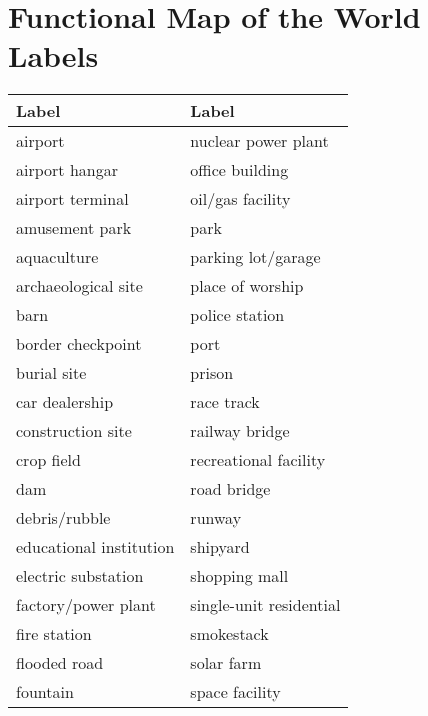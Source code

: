 \documentclass[../thesis.tex]{subfiles}
\begin{document}
    \chapter{Functional Map of the World Labels}
    \label{fmow_labels}
    
    \begin{table}[h]
    	\centering
    	\begin{tabular}{@{}ll@{}}
    		\toprule
    		Label                         & Label                    \\ \midrule
    		airport                       & nuclear power plant      \\
    		airport hangar                & office building          \\
    		airport terminal              & oil/gas facility         \\
    		amusement park                & park                     \\
    		aquaculture                   & parking lot/garage       \\
    		archaeological site           & place of worship         \\
    		barn                          & police station           \\
    		border checkpoint             & port                     \\
    		burial site                   & prison                   \\
    		car dealership                & race track               \\
    		construction site             & railway bridge           \\
    		crop field                    & recreational facility    \\
    		dam                           & road bridge              \\
    		debris/rubble                 & runway                   \\
    		educational institution       & shipyard                 \\
    		electric substation           & shopping mall            \\
    		factory/power plant           & single-unit residential  \\
    		fire station                  & smokestack               \\
    		flooded road                  & solar farm               \\  
    		fountain                      & space facility           \\

\end{tabular}
\end{table}
\end{document}
